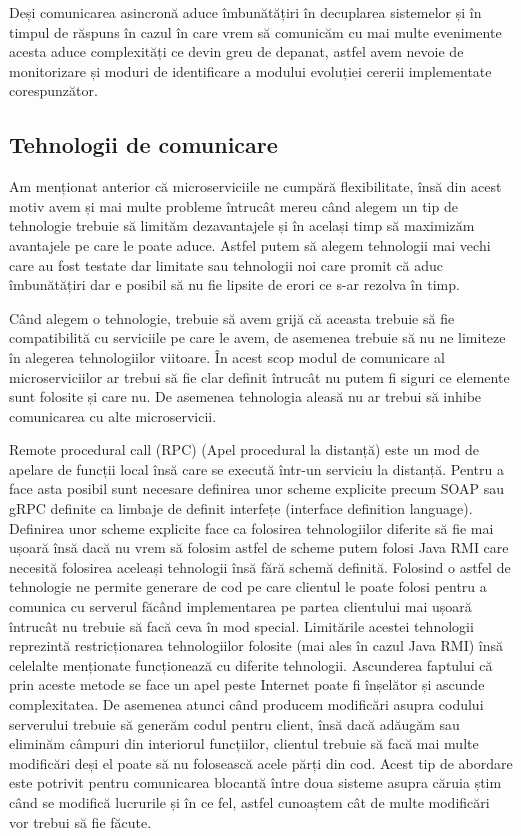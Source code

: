 Deși comunicarea asincronă aduce îmbunătățiri în decuplarea sistemelor și în timpul de răspuns
în cazul în care vrem să comunicăm cu mai multe evenimente acesta aduce complexități ce devin
greu de depanat, astfel avem nevoie de monitorizare și moduri de identificare a modului
evoluției cererii implementate corespunzător.

\subsection{Tehnologii de comunicare}

Am menționat anterior că microserviciile ne cumpără flexibilitate, însă din acest motiv avem
și mai multe probleme întrucât mereu când alegem un tip de tehnologie trebuie să limităm
dezavantajele și în același timp să maximizăm avantajele pe care le poate aduce. Astfel putem să alegem
tehnologii mai vechi care au fost testate dar limitate sau tehnologii noi care promit că aduc îmbunătățiri
dar e posibil să nu fie lipsite de erori ce s-ar rezolva în timp.

Când alegem o tehnologie, trebuie să avem grijă că aceasta trebuie să fie compatibilită cu
serviciile pe care le avem, de asemenea trebuie să nu ne limiteze în alegerea tehnologiilor viitoare.
În acest scop modul de comunicare al microserviciilor ar trebui să fie clar definit întrucât 
nu putem fi siguri ce elemente sunt folosite și care nu. De asemenea tehnologia aleasă
nu ar trebui să inhibe comunicarea cu alte microservicii.

Remote procedural call (RPC) (Apel procedural la distanță) este un mod de apelare de funcții local
însă care se execută într-un serviciu la distanță. Pentru a face asta posibil sunt necesare 
definirea unor scheme explicite precum SOAP sau gRPC definite ca limbaje de definit interfețe
(interface definition language). Definirea unor scheme explicite face ca folosirea tehnologiilor
diferite să fie mai ușoară însă dacă nu vrem să folosim astfel de scheme putem folosi Java RMI
care necesită folosirea aceleași tehnologii însă fără schemă definită. Folosind o astfel de tehnologie
ne permite generare de cod pe care clientul le poate folosi pentru a comunica cu serverul 
făcând implementarea pe partea clientului mai ușoară întrucât nu trebuie să facă ceva în mod special.
Limitările acestei tehnologii reprezintă restricționarea tehnologiilor folosite (mai ales în cazul
Java RMI) însă celelalte menționate funcționează cu diferite tehnologii. Ascunderea faptului
că prin aceste metode se face un apel peste Internet poate fi înșelător și ascunde complexitatea.
De asemenea atunci când producem modificări asupra codului serverului trebuie să generăm codul
pentru client, însă dacă adăugăm sau eliminăm câmpuri din interiorul funcțiilor, clientul trebuie 
să facă mai multe modificări deși el poate să nu folosească acele părți din cod. Acest tip de abordare
este potrivit pentru comunicarea blocantă între doua sisteme asupra căruia știm când se modifică lucrurile și 
în ce fel, astfel cunoaștem cât de multe modificări vor trebui să fie făcute.

